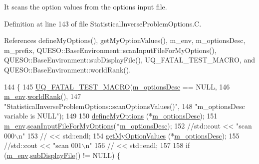 It scans the option values from the options input file. 



Definition at line 143 of file Statistical\-Inverse\-Problem\-Options.\-C.



References define\-My\-Options(), get\-My\-Option\-Values(), m\-\_\-env, m\-\_\-options\-Desc, m\-\_\-prefix, Q\-U\-E\-S\-O\-::\-Base\-Environment\-::scan\-Input\-File\-For\-My\-Options(), Q\-U\-E\-S\-O\-::\-Base\-Environment\-::sub\-Display\-File(), U\-Q\-\_\-\-F\-A\-T\-A\-L\-\_\-\-T\-E\-S\-T\-\_\-\-M\-A\-C\-R\-O, and Q\-U\-E\-S\-O\-::\-Base\-Environment\-::world\-Rank().


\begin{DoxyCode}
144 \{
145   \hyperlink{_defines_8h_a56d63d18d0a6d45757de47fcc06f574d}{UQ\_FATAL\_TEST\_MACRO}(\hyperlink{class_q_u_e_s_o_1_1_statistical_inverse_problem_options_ac7b8dad567ffef98d5a98061a7d631ea}{m\_optionsDesc} == NULL,
146                       \hyperlink{class_q_u_e_s_o_1_1_statistical_inverse_problem_options_afce40a7fed3b00fc8cabad7ff81ef35f}{m\_env}.\hyperlink{class_q_u_e_s_o_1_1_base_environment_a78b57112bbd0e6dd0e8afec00b40ffa7}{worldRank}(),
147                       \textcolor{stringliteral}{"StatisticalInverseProblemOptions::scanOptionsValues()"},
148                       \textcolor{stringliteral}{"m\_optionsDesc variable is NULL"});
149 
150   \hyperlink{class_q_u_e_s_o_1_1_statistical_inverse_problem_options_ae085514e9153c131266f93abea2db3dd}{defineMyOptions}                (*\hyperlink{class_q_u_e_s_o_1_1_statistical_inverse_problem_options_ac7b8dad567ffef98d5a98061a7d631ea}{m\_optionsDesc});
151   \hyperlink{class_q_u_e_s_o_1_1_statistical_inverse_problem_options_afce40a7fed3b00fc8cabad7ff81ef35f}{m\_env}.\hyperlink{class_q_u_e_s_o_1_1_base_environment_ae3e118fc38e17537107b347d6b421927}{scanInputFileForMyOptions}(*\hyperlink{class_q_u_e_s_o_1_1_statistical_inverse_problem_options_ac7b8dad567ffef98d5a98061a7d631ea}{m\_optionsDesc});
152   \textcolor{comment}{//std::cout << "scan 000\(\backslash\)n"}
153   \textcolor{comment}{//          << std::endl;}
154   \hyperlink{class_q_u_e_s_o_1_1_statistical_inverse_problem_options_a5984ab1857cbe72f9f665388f9e87e5e}{getMyOptionValues}              (*\hyperlink{class_q_u_e_s_o_1_1_statistical_inverse_problem_options_ac7b8dad567ffef98d5a98061a7d631ea}{m\_optionsDesc});
155   \textcolor{comment}{//std::cout << "scan 001\(\backslash\)n"}
156   \textcolor{comment}{//          << std::endl;}
157 
158   \textcolor{keywordflow}{if} (\hyperlink{class_q_u_e_s_o_1_1_statistical_inverse_problem_options_afce40a7fed3b00fc8cabad7ff81ef35f}{m\_env}.\hyperlink{class_q_u_e_s_o_1_1_base_environment_a8a0064746ae8dddfece4229b9ad374d6}{subDisplayFile}() != NULL) \{

\end{DoxyCode}
